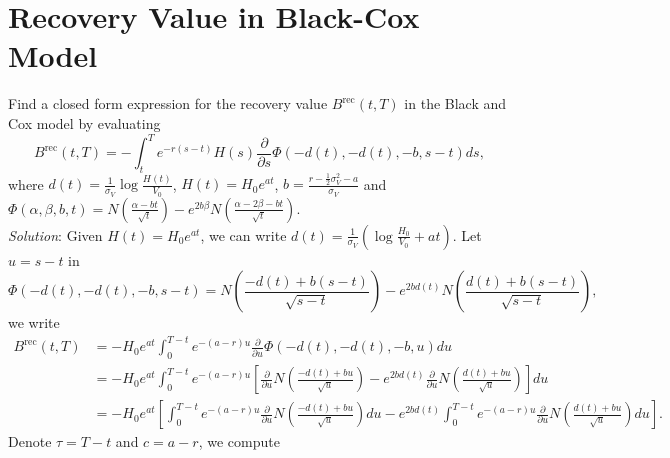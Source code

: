 \documentclass[paper=a4, fontsize=11pt]{scrartcl} %
\numberwithin{equation}{section} %
\numberwithin{figure}{section} %
\numberwithin{table}{section} %
\begin{document}
\newpage
\section{Recovery Value in Black-Cox Model}
Find a closed form expression for the recovery value $B^{\text{rec}}(t, T)$ in the Black
and Cox model by evaluating
$$
B^{\text{rec}}(t, T) = -\int_t^T e^{-r(s-t)}H(s)\frac{\partial}{\partial s}\Phi\left( -d(t), -d(t), -b, s-t \right)ds,
$$
where $d(t) = \frac{1}{\sigma_V}\log\frac{H(t)}{V_0}$, $H(t) = H_0 e^{at}$, $b=\frac{r-\frac{1}{2}\sigma_V^2 - a}{\sigma_V}$ and
$
\Phi(\alpha, \beta, b, t) = N\left( \frac{\alpha -bt }{\sqrt{t}} \right) - e^{2b\beta}
N\left( \frac{\alpha -2\beta -bt }{\sqrt{t}} \right).
$\\
\textit{Solution}: Given $H(t) = H_0 e^{at}$, we can write $d(t) = \frac{1}{\sigma_V} \left(\log\frac{H_0}{V_0} + at\right)$. Let $u=s-t$ in 
$$
\Phi\left( -d(t), -d(t), -b, s-t \right) = N\left( \frac{ -d(t)+b(s-t) }{\sqrt{s-t}} \right) - e^{2bd(t)}
N\left( \frac{d(t) +b(s-t) }{\sqrt{s-t}} \right),
$$
we write
\begin{align}
\nonumber B^{\text{rec}}(t, T) &= -H_0e^{at}\int_0^{T-t} e^{-(a-r)u}\frac{\partial}{\partial u}\Phi\left( -d(t), -d(t), -b, u \right)du\\
\nonumber &=-H_0e^{at}\int_0^{T-t} e^{-(a-r)u}  \left[\frac{\partial}{\partial u}N\left( \frac{ -d(t)+bu }{\sqrt{u}} \right) - e^{2bd(t)}
\frac{\partial}{\partial u} N\left( \frac{d(t) +bu }{\sqrt{u}} \right)\right] du \\
\nonumber &=-H_0e^{at}\left[\int_0^{T-t} e^{-(a-r)u}  \frac{\partial}{\partial u}N\left( \frac{ -d(t)+bu }{\sqrt{u}} \right)du - e^{2bd(t)}
\int_0^{T-t}e^{-(a-r)u}\frac{\partial}{\partial u} N\left( \frac{d(t) +bu }{\sqrt{u}} \right) du\right].
\end{align}
Denote $\tau = T-t$ and $c = a-r$, we compute
\allowdisplaybreaks
\end{document}
